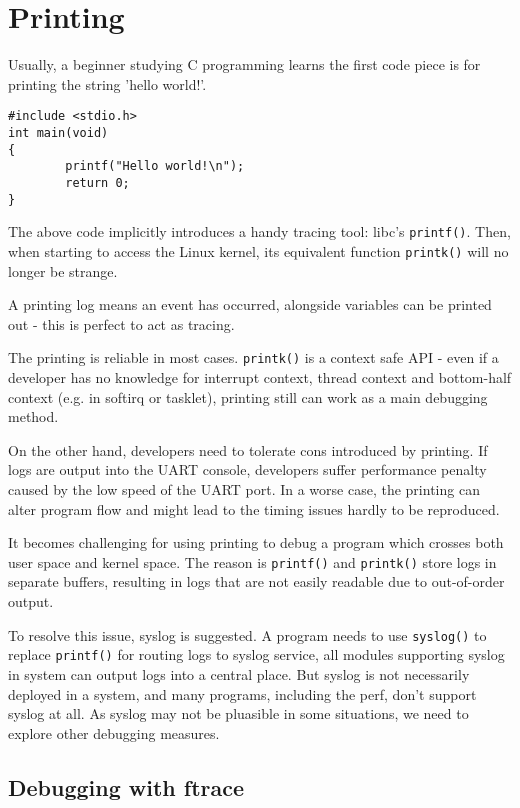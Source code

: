 \documentclass[11pt]{diazessay} %
\def\code#1{\texttt{#1}}
\begin{document}
\section*{Printing}

Usually, a beginner studying C programming learns the first code piece is for
printing the string 'hello world!'.

\begin{lstlisting}
#include <stdio.h>
int main(void)
{
        printf("Hello world!\n");
        return 0;
}
\end{lstlisting}

The above code implicitly introduces a handy tracing tool: libc's
\code{printf()}. Then, when starting to access the Linux kernel, its
equivalent function \code{printk()} will no longer be strange.

A printing log means an event has occurred, alongside variables can be printed
out - this is perfect to act as tracing.

The printing is reliable in most cases. \code{printk()} is a context safe API
- even if a developer has no knowledge for interrupt context, thread context
and bottom-half context (e.g. in softirq or tasklet), printing still can work
as a main debugging method.

On the other hand, developers need to tolerate cons introduced by printing.
If logs are output into the UART console, developers suffer performance
penalty caused by the low speed of the UART port. In a worse case, the
printing can alter program flow and might lead to the timing issues hardly to
be reproduced.

It becomes challenging for using printing to debug a program which crosses
both user space and kernel space. The reason is \code{printf()} and
\code{printk()} store logs in separate buffers, resulting in logs that are not
easily readable due to out-of-order output.

To resolve this issue, syslog is suggested. A program needs to use
\code{syslog()} to replace \code{printf()} for routing logs to syslog
service, all modules supporting syslog in system can output logs into a
central place. But syslog is not necessarily deployed in a system, and many
programs, including the perf, don't support syslog at all. As syslog may not
be pluasible in some situations, we need to explore other debugging measures.

\subsection*{Debugging with ftrace}
\end{document}
